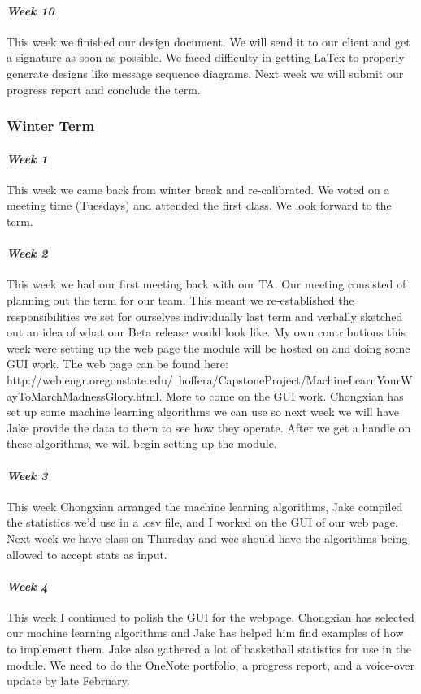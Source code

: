 \documentclass[onecolumn, draftclsnofoot,10pt, compsoc]{IEEEtran}
\begin{document}
\paragraph{\emph{Week 10}}
This week we finished our design document. We will send it to our client and get a signature as soon as possible. We faced difficulty in getting LaTex to properly generate designs like message sequence diagrams. Next week we will submit our progress report and conclude the term.
\subsubsection{Winter Term}
\paragraph{\emph{Week 1}}
This week we came back from winter break and re-calibrated. We voted on a meeting time (Tuesdays) and attended the first class. We look forward to the term.
\paragraph{\emph{Week 2}}
This week we had our first meeting back with our TA. Our meeting consisted of planning out the term for our team. This meant we re-established the responsibilities we set for ourselves individually last term and verbally sketched out an idea of what our Beta release would look like. My own contributions this week were setting up the web page the module will be hosted on and doing some GUI work. The web page can be found here: http://web.engr.oregonstate.edu/~hoffera/CapstoneProject/MachineLearnYourWayToMarchMadnessGlory.html. More to come on the GUI work. Chongxian has set up some machine learning algorithms we can use so next week we will have Jake provide the data to them to see how they operate. After we get a handle on these algorithms, we will begin setting up the module.
\paragraph{\emph{Week 3}}
This week Chongxian arranged the machine learning algorithms, Jake compiled the statistics we'd use in a .csv file, and I worked on the GUI of our web page. Next week we have class on Thursday and wee should have the algorithms being allowed to accept stats as input.
\paragraph{\emph{Week 4}}
This week I continued to polish the GUI for the webpage. Chongxian has selected our machine learning algorithms and Jake has helped him find examples of how to implement them. Jake also gathered a lot of basketball statistics for use in the module. We need to do the OneNote portfolio, a progress report, and a voice-over update by late February.
\end{document}

